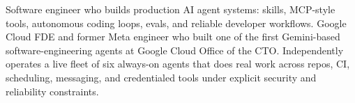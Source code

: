 


Software engineer who builds production AI agent systems: skills, MCP-style tools, autonomous coding loops, evals, and reliable developer workflows. Google Cloud FDE and former Meta engineer who built one of the first Gemini-based software-engineering agents at Google Cloud Office of the CTO. Independently operates a live fleet of six always-on agents that does real work across repos, CI, scheduling, messaging, and credentialed tools under explicit security and reliability constraints.







